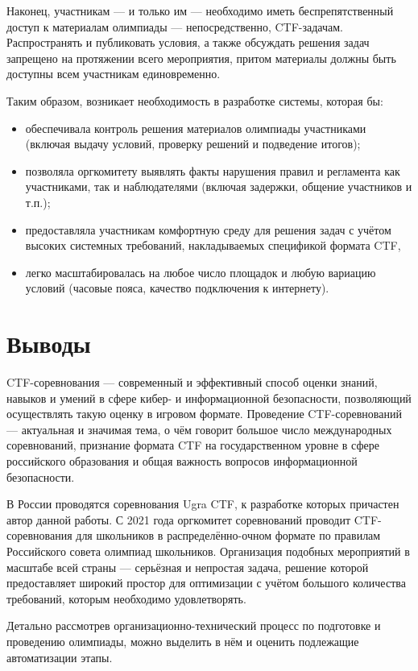 Наконец, участникам — и только им — необходимо иметь беспрепятственный доступ к материалам олимпиады — непосредственно, CTF-задачам. Распространять и публиковать условия, а также обсуждать решения задач запрещено на протяжении всего мероприятия, притом материалы должны быть доступны всем участникам единовременно.

Таким образом, возникает необходимость в разработке системы, которая бы:
\begin{itemize}
\item
  обеспечивала контроль решения материалов олимпиады участниками (включая выдачу условий, проверку решений и подведение итогов);
\item
  позволяла оргкомитету выявлять факты нарушения правил и регламента как участниками, так и наблюдателями (включая задержки, общение участников и т.п.);
\item
  предоставляла участникам комфортную среду для решения задач с учётом высоких системных требований, накладываемых спецификой формата CTF,
\item
  легко масштабировалась на любое число площадок и любую вариацию условий (часовые пояса, качество подключения к интернету).
\end{itemize}

\section{Выводы}

CTF-соревнования — современный и эффективный способ оценки знаний, навыков и умений в сфере кибер- и информационной безопасности, позволяющий осуществлять такую оценку в игровом формате. Проведение CTF-соревнований — актуальная и значимая тема, о чём говорит большое число международных соревнований, признание формата CTF на государственном уровне в сфере российского образования и общая важность вопросов информационной безопасности.

В России проводятся соревнования Ugra CTF, к разработке которых причастен автор данной работы. С 2021 года оргкомитет соревнований проводит CTF-соревнования для школьников в распределённо-очном формате по правилам Российского совета олимпиад школьников. Организация подобных мероприятий в масштабе всей страны — серьёзная и непростая задача, решение которой предоставляет широкий простор для оптимизации с учётом большого количества требований, которым необходимо удовлетворять.

Детально рассмотрев организационно-технический процесс по подготовке и проведению олимпиады, можно выделить в нём и оценить подлежащие автоматизации этапы.



